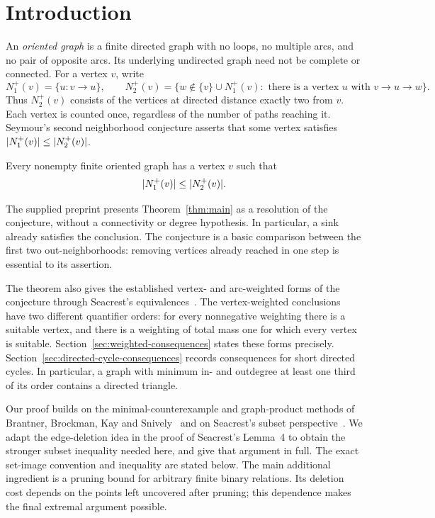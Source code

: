 \section{Introduction}\label{sec:introduction}

An \emph{oriented graph} is a finite directed graph with no loops, no multiple
arcs, and no pair of opposite arcs.  Its underlying undirected graph need
not be complete or connected.  For a vertex \(v\), write
\[
 N_1^+(v)=\{u:v\to u\},\qquad
 N_2^+(v)=\{w\notin\{v\}\cup N_1^+(v):
                 \text{ there is a vertex }u\text{ with }v\to u\to w\}.
\]
Thus \(N_2^+(v)\) consists of the vertices at directed distance exactly two
from \(v\).  Each vertex is counted once, regardless of the number of paths
reaching it.  Seymour's second neighborhood conjecture asserts that some
vertex satisfies \(\lvert N_1^+(v)\rvert\leq\lvert N_2^+(v)\rvert\).

\begin{theorem}\label{thm:main}
Every nonempty finite oriented graph has a vertex \(v\) such that
\[
 \lvert N_1^+(v)\rvert\leq \lvert N_2^+(v)\rvert.
\]
\end{theorem}

The supplied preprint presents Theorem~\ref{thm:main} as a resolution of the conjecture, without a
connectivity or degree hypothesis.  In particular, a sink already satisfies
the conclusion.  The conjecture is a basic comparison between the first two
out-neighborhoods: removing vertices already reached in one step is essential
to its assertion.

The theorem also gives the established vertex- and arc-weighted forms of
the conjecture through Seacrest's equivalences~\cite{Seacrest2015}.
The vertex-weighted conclusions have two different quantifier orders:
for every nonnegative weighting there is a suitable vertex, and there is
a weighting of total mass one for which every vertex is suitable.
Section~\ref{sec:weighted-consequences} states these forms precisely.
Section~\ref{sec:directed-cycle-consequences} records consequences for
short directed cycles.  In particular, a graph with minimum in- and
outdegree at least one third of its order contains a directed triangle.

Our proof builds on the minimal-counterexample and graph-product
methods of Brantner, Brockman, Kay and
Snively~\cite{BrantnerBrockmanKaySnively2009} and on Seacrest's
subset perspective~\cite{Seacrest2019}.
We adapt the edge-deletion idea in the proof of Seacrest's Lemma~4 to
obtain the stronger subset inequality needed here, and give that argument
in full.  The exact set-image convention and inequality are stated below.
The main additional ingredient is a pruning bound for arbitrary finite
binary relations.  Its deletion cost depends on the points left uncovered
after pruning; this dependence makes the final extremal argument possible.


